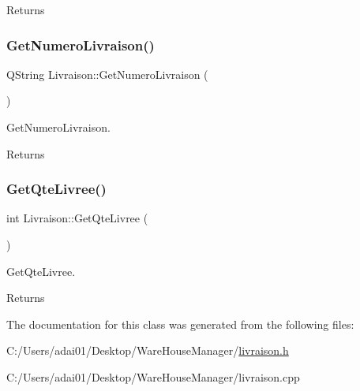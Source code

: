 \begin{DoxyReturn}{Returns}

\end{DoxyReturn}
\mbox{\label{class_livraison_a76aab51a1430b445d8d9802d972f5b8e}} 
\subsubsection{\texorpdfstring{Get\+Numero\+Livraison()}{GetNumeroLivraison()}}
{\footnotesize\ttfamily Q\+String Livraison\+::\+Get\+Numero\+Livraison (\begin{DoxyParamCaption}{ }\end{DoxyParamCaption})}



Get\+Numero\+Livraison. 

\begin{DoxyReturn}{Returns}

\end{DoxyReturn}
\mbox{\label{class_livraison_a4995d5e50d6c62b1ab33725bae61b777}} 
\subsubsection{\texorpdfstring{Get\+Qte\+Livree()}{GetQteLivree()}}
{\footnotesize\ttfamily int Livraison\+::\+Get\+Qte\+Livree (\begin{DoxyParamCaption}{ }\end{DoxyParamCaption})}



Get\+Qte\+Livree. 

\begin{DoxyReturn}{Returns}

\end{DoxyReturn}


The documentation for this class was generated from the following files\+:\begin{DoxyCompactItemize}
\item 
C\+:/\+Users/adai01/\+Desktop/\+Ware\+House\+Manager/\mbox{\hyperlink{livraison_8h}{livraison.\+h}}\item 
C\+:/\+Users/adai01/\+Desktop/\+Ware\+House\+Manager/livraison.\+cpp\end{DoxyCompactItemize}
